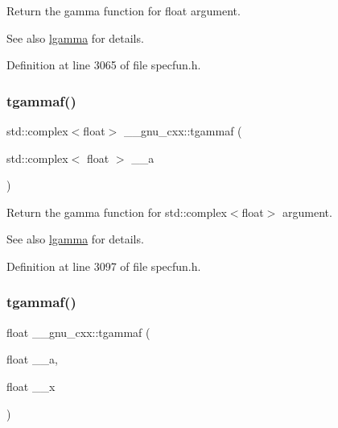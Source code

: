 Return the gamma function for {\ttfamily  float } argument.

\begin{DoxySeeAlso}{See also}
\hyperlink{group__mathsf__gnu_ga40fa5127f7c419ed1d8f1c6a6f96ea9b}{lgamma} for details. 
\end{DoxySeeAlso}


Definition at line 3065 of file specfun.\+h.

\mbox{\label{group__mathsf__gnu_gaf548b80db1501cbc067de1564e721972}} 
\subsubsection{\texorpdfstring{tgammaf()}{tgammaf()}\hspace{0.1cm}{\footnotesize\ttfamily [2/3]}}
{\footnotesize\ttfamily std\+::complex$<$float$>$ \+\_\+\+\_\+gnu\+\_\+cxx\+::tgammaf (\begin{DoxyParamCaption}\item[{std\+::complex$<$ float $>$}]{\+\_\+\+\_\+a }\end{DoxyParamCaption})\hspace{0.3cm}{\ttfamily [inline]}}

Return the gamma function for {\ttfamily  std\+::complex$<$float$>$ } argument.

\begin{DoxySeeAlso}{See also}
\hyperlink{group__mathsf__gnu_ga40fa5127f7c419ed1d8f1c6a6f96ea9b}{lgamma} for details. 
\end{DoxySeeAlso}


Definition at line 3097 of file specfun.\+h.

\mbox{\label{group__mathsf__gnu_ga942773871e9c21a50cf13ec160e7e8d9}} 
\subsubsection{\texorpdfstring{tgammaf()}{tgammaf()}\hspace{0.1cm}{\footnotesize\ttfamily [3/3]}}
{\footnotesize\ttfamily float \+\_\+\+\_\+gnu\+\_\+cxx\+::tgammaf (\begin{DoxyParamCaption}\item[{float}]{\+\_\+\+\_\+a,  }\item[{float}]{\+\_\+\+\_\+x }\end{DoxyParamCaption})\hspace{0.3cm}{\ttfamily [inline]}}

